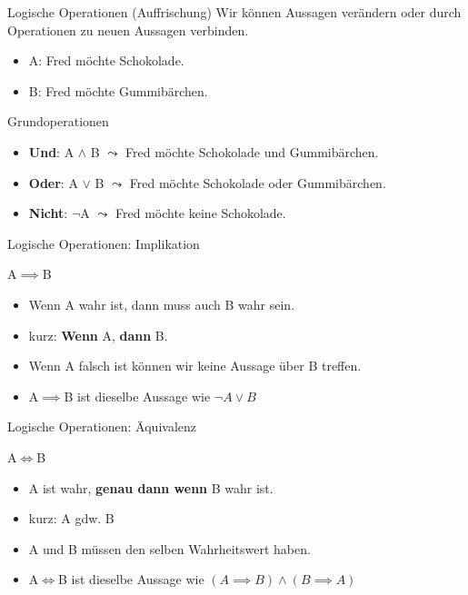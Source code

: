 \begin{frame}[fragile]{Logische Operationen (Auffrischung)}
Wir können Aussagen verändern oder durch Operationen zu neuen Aussagen verbinden.
\begin{itemize}
    \item A: Fred möchte Schokolade.
    \item B: Fred möchte Gummibärchen.
\end{itemize}
\begin{alertblock}{Grundoperationen}
\begin{itemize}
    \item<1-> \textbf{Und}: A \alert<1>{$\wedge$} B $\leadsto$ Fred möchte Schokolade \alert<1>{und} Gummibärchen.
    \item<2-> \textbf{Oder}: A \alert<2>{$\vee$} B $\leadsto$ Fred möchte Schokolade \alert<2>{oder} Gummibärchen.\\
    \item<3> \textbf{Nicht}: \alert<3>{$\neg$}A $\leadsto$ Fred möchte \alert<3>{keine} Schokolade.
\end{itemize}
\end{alertblock}
\end{frame}

\begin{frame}{Logische Operationen: Implikation}
\begin{alertblock}{A$\implies$B}
\begin{itemize}
    \item \glqq Wenn A wahr ist, dann muss auch B wahr sein.\grqq
    \item kurz: \glqq\textbf{Wenn} A, \textbf{dann} B.\grqq
    \item Wenn A falsch ist können wir keine Aussage über B treffen.
    \item A$\implies$B ist dieselbe Aussage wie $\neg A \vee B$
\end{itemize}
\end{alertblock}
\end{frame}

\begin{frame}{Logische Operationen: Äquivalenz}
\begin{alertblock}{A$\iff$B}
\begin{itemize}
    \item \glqq A ist wahr, \textbf{genau dann wenn} B wahr ist.\grqq
    \item kurz: \glqq A gdw. B\grqq
    \item A und B müssen den selben Wahrheitswert haben.
    \item A$\iff$B ist dieselbe Aussage wie $(A \implies B) \wedge (B \implies A)$
\end{itemize}
\end{alertblock}
\end{frame}


